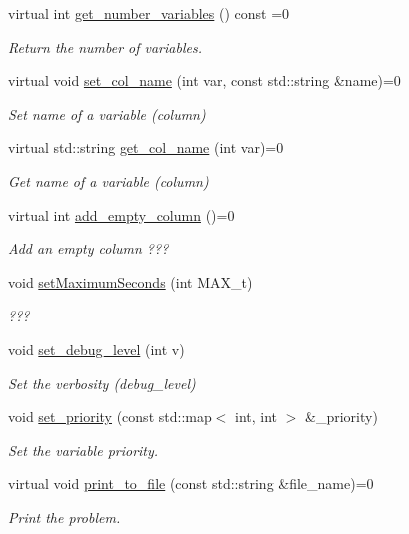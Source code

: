 \begin{DoxyCompactItemize}
virtual int \hyperlink{classmeilp__solver_abcbe8b799332dd2f29c042488e3655ab}{get\+\_\+number\+\_\+variables} () const =0
\begin{DoxyCompactList}\small\item\em Return the number of variables. \end{DoxyCompactList}\item 
virtual void \hyperlink{classmeilp__solver_a25c13b43b35a744bb0243fe6f8192244}{set\+\_\+col\+\_\+name} (int var, const std\+::string \&name)=0
\begin{DoxyCompactList}\small\item\em Set name of a variable (column) \end{DoxyCompactList}\item 
virtual std\+::string \hyperlink{classmeilp__solver_a8bed22d1f0a2a87868f46089c57a6add}{get\+\_\+col\+\_\+name} (int var)=0
\begin{DoxyCompactList}\small\item\em Get name of a variable (column) \end{DoxyCompactList}\item 
virtual int \hyperlink{classmeilp__solver_aa1fc55c72dd2b8cf1465dbf99e31127c}{add\+\_\+empty\+\_\+column} ()=0
\begin{DoxyCompactList}\small\item\em Add an empty column ??? \end{DoxyCompactList}\item 
void \hyperlink{classmeilp__solver_a4ef0f57f14ac9ce9707f617310635e55}{set\+Maximum\+Seconds} (int M\+A\+X\+\_\+t)
\begin{DoxyCompactList}\small\item\em ??? \end{DoxyCompactList}\item 
void \hyperlink{classmeilp__solver_a13730dbd89312c75d175d5e7f66bb358}{set\+\_\+debug\+\_\+level} (int v)
\begin{DoxyCompactList}\small\item\em Set the verbosity (debug\+\_\+level) \end{DoxyCompactList}\item 
void \hyperlink{classmeilp__solver_a40f8db00eeeeff115b97ffaf9511bab2}{set\+\_\+priority} (const std\+::map$<$ int, int $>$ \&\+\_\+priority)
\begin{DoxyCompactList}\small\item\em Set the variable priority. \end{DoxyCompactList}\item 
virtual void \hyperlink{classmeilp__solver_af9f40eca7fda0fae7436fe7a24c589b7}{print\+\_\+to\+\_\+file} (const std\+::string \&file\+\_\+name)=0
\begin{DoxyCompactList}\small\item\em Print the problem. \end{DoxyCompactList}\end{DoxyCompactItemize}
